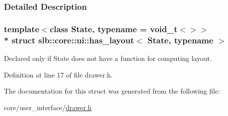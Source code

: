 \subsubsection{Detailed Description}
\subsubsection*{template$<$class State, typename = void\+\_\+t$<$$>$$>$\\*
struct slb\+::core\+::ui\+::has\+\_\+layout$<$ State, typename $>$}

Declared only if {\ttfamily State} does not have a function for computing layout. 

Definition at line 17 of file drawer.\+h.



The documentation for this struct was generated from the following file\+:\begin{DoxyCompactItemize}
\item 
core/user\+\_\+interface/\hyperlink{drawer_8h}{drawer.\+h}\end{DoxyCompactItemize}
